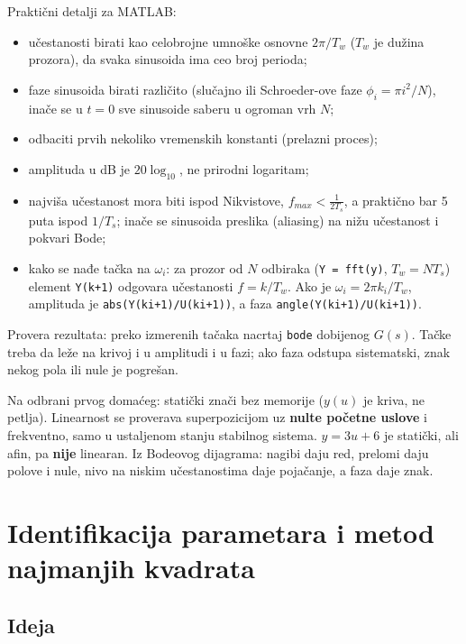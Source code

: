 \documentclass[11pt,a4paper,parskip=half,headsepline,numbers=noenddot]{scrartcl}
\begin{document}
Praktični detalji za MATLAB:

\begin{itemize}
\item učestanosti birati kao celobrojne umnoške osnovne \(2\pi/T_w\) (\(T_w\) je dužina prozora), da svaka sinusoida ima ceo broj perioda;
\item faze sinusoida birati različito (slučajno ili Schroeder-ove faze \(\phi_i = \pi i^2/N\)), inače se u \(t = 0\) sve sinusoide saberu u ogroman vrh \(N\);
\item odbaciti prvih nekoliko vremenskih konstanti (prelazni proces);
\item amplituda u dB je \(20\log_{10}\), ne prirodni logaritam;
\item najviša učestanost mora biti ispod Nikvistove, \(f_{max} < \frac{1}{2T_s}\), a praktično bar 5 puta ispod \(1/T_s\); inače se sinusoida preslika (aliasing) na nižu učestanost i pokvari Bode;
\item kako se nađe tačka na \(\omega_i\): za prozor od \(N\) odbiraka (\texttt{Y\ =\ fft(\allowbreak{}y)}, \(T_w = NT_s\)) element \texttt{Y(k+1)} odgovara učestanosti \(f = k/T_w\). Ako je \(\omega_i = 2\pi k_i/T_w\), amplituda je \texttt{abs(\allowbreak{}Y(\allowbreak{}ki+1)/\allowbreak{}U(\allowbreak{}ki+1))}, a faza \texttt{angle(\allowbreak{}Y(\allowbreak{}ki+1)/\allowbreak{}U(\allowbreak{}ki+1))}.
\end{itemize}

Provera rezultata: preko izmerenih tačaka nacrtaj \texttt{bode} dobijenog \(G(s)\). Tačke treba da leže na krivoj i u amplitudi i u fazi; ako faza odstupa sistematski, znak nekog pola ili nule je pogrešan.

\begin{ispit}
Na odbrani prvog domaćeg: statički znači bez memorije (\(y(u)\) je kriva, ne petlja). Linearnost se proverava superpozicijom uz \textbf{nulte početne uslove} i frekventno, samo u ustaljenom stanju stabilnog sistema. \(y = 3u + 6\) je statički, ali afin, pa \textbf{nije} linearan. Iz Bodeovog dijagrama: nagibi daju red, prelomi daju polove i nule, nivo na niskim učestanostima daje pojačanje, a faza daje znak.
\end{ispit}

\section{Identifikacija parametara i metod najmanjih kvadrata}

\subsection{Ideja}
\end{document}
